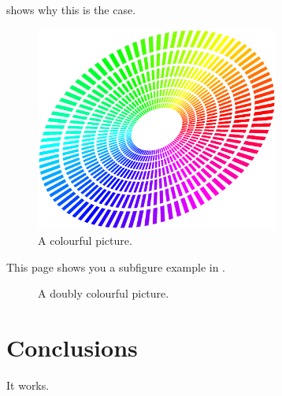 \documentclass{ecsproject}     %
\begin{document}
 shows why this is the case.
\begin{figure}[!htb]
  \centering
  \includegraphics[width=8cm]{figure}
  \caption{A colourful picture.}
  \label{Figure:figex}
\end{figure}
\newpage
This page shows you a subfigure example in .
\begin{figure}[!htb]
  \centering
  \caption{A doubly colourful picture.}
  \label{Figure:figsubex}
\end{figure}


\chapter{Conclusions} \label{Chapter:Conclusions}
It works.



% 
\backmatter


\end{document}
